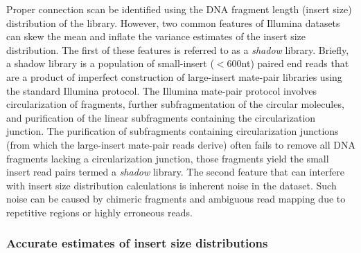 \documentclass{bioinfo}
\begin{document}
Proper connection scan be identified using the DNA fragment length (insert size) distribution of the library. However, two common features of
Illumina datasets can skew the mean and inflate the variance estimates of the insert size distribution. The first of these features is referred 
to as a \emph{shadow} library. Briefly, a shadow library is a population of small-insert ($<$600nt) paired end reads that are a product of 
imperfect construction of large-insert mate-pair libraries using the standard Illumina protocol. The Illumina mate-pair protocol involves 
circularization of fragments, further subfragmentation of the circular molecules, and purification of the linear subfragments containing the circularization junction. 
The purification of subfragments containing circularization junctions (from which the large-insert mate-pair reads derive) often fails to remove all 
DNA fragments lacking a circularization junction, those fragments yield the small insert read pairs termed a \emph{shadow} library. The second 
feature that can interfere with insert size distribution calculations is inherent noise in the dataset. Such noise can be caused by chimeric 
fragments and ambiguous read mapping due to repetitive regions or highly erroneous reads. 


\subsubsection{Accurate estimates of insert size distributions}
\end{document}
